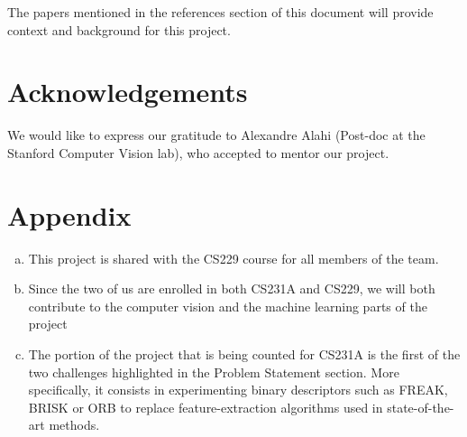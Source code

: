 \documentclass[10pt,twocolumn,letterpaper]{article}
\begin{document}
The papers mentioned in the references section of this document will provide context and background for this project.

\section{Acknowledgements}

We would like to express our gratitude to Alexandre Alahi (Post-doc at the Stanford Computer Vision lab), who accepted to mentor our project.

{\small


}

\section{Appendix}

	\begin{enumerate}[a)]
	\item This project is shared with the CS229 course for all members of the team.
	\item Since the two of us are enrolled in both CS231A and CS229, we will both contribute to the computer vision and the machine learning parts of the project
	\item The portion of the project that is being counted for CS231A is the first of the two challenges highlighted in the Problem Statement section. More specifically, it consists in experimenting binary descriptors such as FREAK, BRISK or ORB to replace feature-extraction algorithms used in state-of-the-art methods.
	\end{enumerate}
\end{document}
